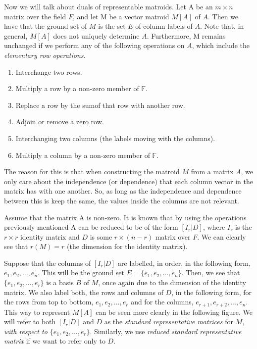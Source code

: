 Now we will talk about duals of representable matroids.
Let A be an $m \times n$ matrix over the field $F$, and let M be a vector matroid $M[A]$ of $A$. Then we have that the ground set of $M$ is the set $E$ of column labels of $A$. Note that, in general, $M[A]$ does not uniquely determine $A$. Furthermore, M remains unchanged if we perform any of the following operations on $A$, which include the \textit{elementary row operations}.
\begin{enumerate}
    \item Interchange two rows.
    \item Multiply a row by a non-zero member of $\mathbb{F}$.
    \item Replace a row by the sumof that row with another row.
    \item Adjoin or remove a zero row.
    \item Interchanging two columns (the labels moving with the columns).
    \item Multiply a column by a non-zero member of $\mathbb{F}$.
\end{enumerate}

The reason for this is that when constructing the matroid $M$ from a matrix $A$, we only care about the independence (or dependence) that each column vector in the matrix has with one another. So, as long as the independence and dependence between this is keep the same, the values inside the columns are not relevant.

Assume that the matrix A is non-zero. It is known that by using the operations previously mentioned A can be reduced to be of the form $[I_r|D]$, where $I_r$ is the $r \times r$ identity matrix and $D$ is some $r \times (n-r)$ matrix over $F$. We can clearly see that $r(M)=r$ (the dimension for the identity matrix). 

Suppose that the columns of $[I_r|D]$ are labelled, in order, in the following form, $e_1, e_2,...,e_n$. This will be the ground set $E=\{e_1, e_2,...,e_n\}$. Then, we see that $\{e_1, e_2,...,e_r\}$ is a basis $B$ of $M$, once again due to the dimension of the identity matrix. We also label both, the rows and columns of $D$, in the following form, for the rows from top to bottom, $e_1, e_2,...,e_r$ and for the columns,  $e_{r+1}, e_{r+2},...,e_n$. This way to represent $M[A]$ can be seen more clearly in the following figure. We will refer to both $[I_r|D]$ and $D$ as the \textit{standard representative matrices} for $M$, \textit{with respect to $\{e_1, e_2,...,e_r\}$}. Similarly, we use \textit{reduced standard representative matrix} if we want to refer only to $D$.

